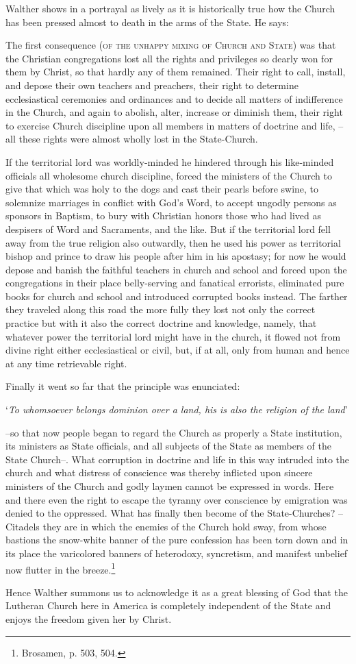 {                Walther shows in a portrayal as lively as it is historically true how the Church has been pressed almost to death in the arms of the State.  He says:} \begin{fancyquotes}The first consequence {\scriptsize\textsc{(of the unhappy mixing of Church and State)}} was that the Christian congregations lost all the rights and privileges so dearly won for them by Christ, so that hardly any of them remained.  Their right to call, install, and depose their own teachers and preachers, their right to determine ecclesiastical ceremonies and ordinances and to decide all matters of indifference in the Church, and again to abolish, alter, increase or diminish them, their right to exercise Church discipline upon all members in matters of doctrine and life, -- all these rights were almost wholly lost in the State-Church. \par If the territorial lord was worldly-minded he hindered through his like-minded officials all wholesome church discipline, forced the ministers of the Church to give that which was holy to the dogs and cast their pearls before swine, to solemnize marriages in conflict with God’s Word, to accept ungodly persons as sponsors in Baptism, to bury with Christian honors those who had lived as despisers of Word and Sacraments, and the like.  But if the territorial lord fell away from the true religion also outwardly, then he used his power as territorial bishop and prince to draw his people after him in his apostasy; for now he would depose and banish the faithful teachers in church and school and forced upon the congregations in their place belly-serving and fanatical errorists, eliminated pure books for church and school and introduced corrupted books instead.  The farther they traveled along this road the more fully they lost not only the correct practice but with it also the correct doctrine and knowledge, namely, that whatever power the territorial lord might have in the church, it flowed not from divine right either ecclesiastical or civil, but, if at all, only from human and hence at any time retrievable right.\par  Finally it went so far that the principle was enunciated: \begin{displayquote}‘\textit{To whomsoever belongs dominion over a land, his is also the religion of the land}’\end{displayquote} --so that now people began to regard the Church as properly a State institution, its ministers as State officials, and all subjects of the State as members of the State Church--.  What corruption in doctrine and life in this way intruded into the church and what distress of conscience was thereby inflicted upon sincere ministers of the Church and godly laymen cannot be expressed in words.  Here and there even the right to escape the tyranny over conscience by emigration was denied to the oppressed.  What has finally then become of the State-Churches? -- Citadels they are in which the enemies of the Church hold sway, from whose bastions the snow-white banner of the pure confession has been torn down and in its place the varicolored banners of heterodoxy, syncretism, and manifest unbelief now flutter in the breeze.\footnote{Brosamen, p. 503, 504.}\end{fancyquotes}

                Hence Walther summons us to acknowledge it as a great blessing of God that the Lutheran Church here in America is completely independent of the State and enjoys the freedom given her by Christ.